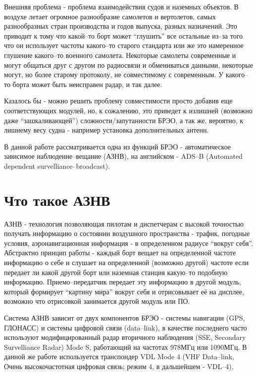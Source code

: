 \documentclass[a4paper,12pt]{report} %
\begin{document}
Внешняя проблема - проблема взаимодействия судов и наземных объектов. В воздухе
летает огромное разнообразие самолетов и вертолетов, самых разнообразных стран
производства и годов выпуска, разных назначений. Это приводит к тому что
какой--то борт может ``глушить'' все остальные из--за того что он использует
частоты какого--то старого стандарта или же это намеренное глушение какого--то
военного самолета. Некоторые самолеты современные и могут общаться друг с другом
по радиосвязи и обмениваться данными, некоторые могут, но более старому
протоколу, не совместимому с современным. У какого--то борта может быть
неисправен радар, и так далее.

Казалось бы - можно решить проблему совместимости просто добавив еще
соответствующих модулей, но, к сожалению, это приведет к излишней (возможно даже
``зашкаливающей'') сложности/запутанности БРЭО, а так же, вероятно, к лишнему
весу судна - например установка дополнительных антенн.

В данной работе рассматривается одна из функций БРЭО - автоматическое зависимое
наблюдение--вещание (АЗНВ), на английском - ADS--B (Automated dependent
survelliance--broadcast).

\section{Что такое АЗНВ}

АЗНВ - технология позволяющая пилотам и диспетчерам с высокой точностью получать
информацию о состоянии воздушного пространства - трафик, погодные условия,
аэронавигационная информация - в определенном радиусе ``вокруг себя''.
Абстрактно принцип работы - каждый борт вещает на определенной частоте информацию о себе и
слушает на определенной (возможно другой) частоте если передает ли какой другой
борт или наземная станция какую--то подобную информацию. Приемо--передатчик
передает эту информацию в другой модуль, который формирует ``картину мира''
вокруг себя и отрисовывает её на дисплее, возможно что отрисовкой занимается
другой модуль или ПО.

Система АЗНВ зависит от двух компонентов БРЭО - системы навигации (GPS, ГЛОНАСС)
и системы цифровой связи (data--link), в качестве последнего часто используют
модифицированный радар вторичного наблюдения (SSE, Secondary Survelliance Radar)
Mode S, работающий на частотах 978МГц или 1090МГц. В данной же работе
используется транспондер VDL Mode 4 (VHF Data--link, Очень высокочастотная цифровая
связь; режим 4, в дальшейшем - VDL--4).
\newpage
\end{document}
